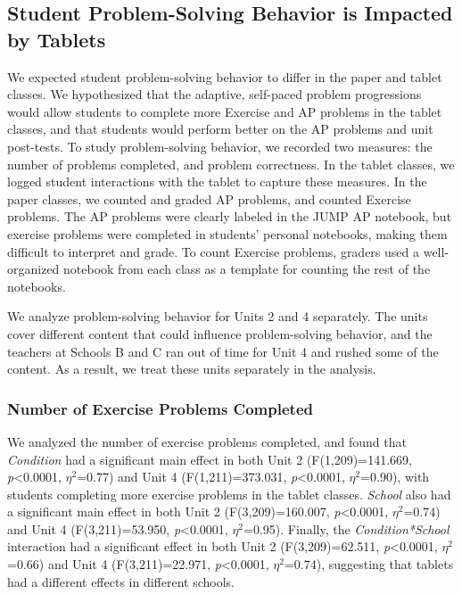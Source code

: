 \documentclass{sigchi}
\begin{document}
\subsection{Student Problem-Solving Behavior is Impacted by Tablets}
We expected student problem-solving behavior to differ in the paper and tablet classes. We hypothesized that the adaptive, self-paced problem progressions would allow students to complete more Exercise and AP problems in the tablet classes, and that students would perform better on the AP problems and unit post-tests. To study problem-solving behavior, we recorded two measures: the number of problems completed, and problem correctness. In the tablet classes, we logged student interactions with the tablet to capture these measures. In the paper classes, we counted and graded AP problems, and counted Exercise problems. The AP problems were clearly labeled in the JUMP AP notebook, but exercise problems were completed in students' personal notebooks, making them difficult to interpret and grade. To count Exercise problems, graders used a well-organized notebook from each class as a template for counting the rest of the notebooks. 

We analyze problem-solving behavior for Units 2 and 4 separately. The units cover different content that could influence problem-solving behavior, and the teachers at Schools B and C ran out of time for Unit 4 and rushed some of the content. As a result, we treat these units separately in the analysis.



\subsubsection{Number of Exercise Problems Completed}
We analyzed the number of exercise problems completed, and found that \emph{Condition} had a significant main effect in both Unit 2 (F(1,209)=141.669, \emph{p}\textless0.0001, $\eta^2$=0.77) and Unit 4 (F(1,211)=373.031, \emph{p}\textless0.0001, $\eta^2$=0.90), with students completing more exercise problems in the tablet classes. \emph{School} also had a significant main effect in both Unit 2 (F(3,209)=160.007, \emph{p}\textless0.0001, $\eta^2$=0.74) and Unit 4 (F(3,211)=53.950, \emph{p}\textless0.0001, $\eta^2$=0.95). Finally, the \emph{Condition*School} interaction had a significant effect in both Unit 2 (F(3,209)=62.511, \emph{p}\textless0.0001, $\eta^2$=0.66) and Unit 4 (F(3,211)=22.971, \emph{p}\textless0.0001, $\eta^2$=0.74), suggesting that tablets had a different effects in different schools.
\end{document}
